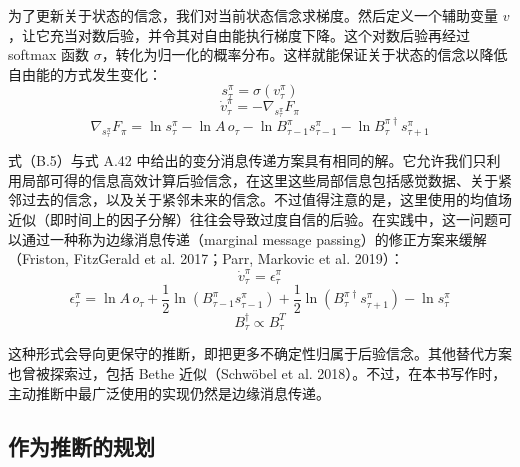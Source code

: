 为了更新关于状态的信念，我们对当前状态信念求梯度。然后定义一个辅助变量 $v$，让它充当对数后验，并令其对自由能执行梯度下降。这个对数后验再经过 softmax 函数 $\sigma$，转化为归一化的概率分布。这样就能保证关于状态的信念以降低自由能的方式发生变化：
\begin{equation}
s_\tau^\pi=\sigma(v_\tau^\pi)
\end{equation}
\begin{equation}
\dot{v}_\tau^\pi=-\nabla_{s_\tau^\pi}F_\pi
\end{equation}
\begin{equation}
\nabla_{s_\tau^\pi}F_\pi
=
\ln s_\tau^\pi
-\ln A\,o_\tau
-\ln B_{\tau-1}^\pi s_{\tau-1}^\pi
-\ln B_\tau^{\pi\dagger}s_{\tau+1}^\pi
\tag{B.5}
\end{equation}

式（B.5）与式 A.42 中给出的变分消息传递方案具有相同的解。它允许我们只利用局部可得的信息高效计算后验信念，在这里这些局部信息包括感觉数据、关于紧邻过去的信念，以及关于紧邻未来的信念。不过值得注意的是，这里使用的均值场近似（即时间上的因子分解）往往会导致过度自信的后验。在实践中，这一问题可以通过一种称为边缘消息传递（marginal message passing）的修正方案来缓解（Friston, FitzGerald et al. 2017；Parr, Markovic et al. 2019）：
\begin{equation}
\dot{v}_\tau^\pi=\epsilon_\tau^\pi
\end{equation}
\begin{equation}
\epsilon_\tau^\pi
=
\ln A\,o_\tau
+\frac{1}{2}\ln\!\left(B_{\tau-1}^\pi s_{\tau-1}^\pi\right)
+\frac{1}{2}\ln\!\left(B_\tau^{\pi\dagger}s_{\tau+1}^\pi\right)
-\ln s_\tau^\pi
\tag{B.6}
\end{equation}
\begin{equation}
B_\tau^\dagger \propto B_\tau^T
\tag{B.6续}
\end{equation}

这种形式会导向更保守的推断，即把更多不确定性归属于后验信念。其他替代方案也曾被探索过，包括 Bethe 近似（Schw\"obel et al. 2018）。不过，在本书写作时，主动推断中最广泛使用的实现仍然是边缘消息传递。

\subsection{作为推断的规划}

